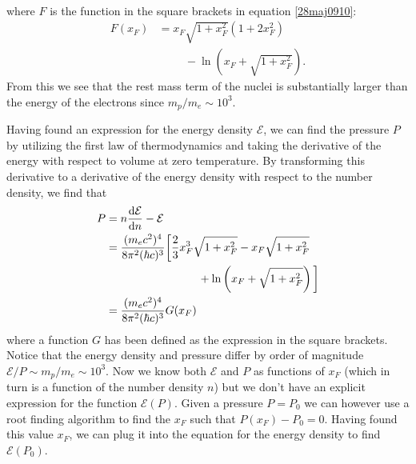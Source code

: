 \documentclass[twocolumn]{article}
\begin{document}
\begin{large}
\begin{equation}
\begin{split}
    \end{split}
\end{equation}
where $F$ is the function in the square brackets in equation \eqref{28maj0910}:
\begin{equation}
    \begin{split}
        F(x_F) &= x_F\sqrt{1+x_F^2}\left(1+2x_F^2\right) \\ 
        &\hspace{1cm}-\ln\left(x_F+\sqrt{1+x_F^2}\right).
    \end{split}
\end{equation}
From this we see that the rest mass term of the nuclei is substantially larger than the energy of the electrons since $m_p/m_e\sim 10^3$. 

Having found an expression for the energy density $\mathcal{E}$, we can find the pressure $P$ by utilizing the first law of thermodynamics and taking the derivative of the energy with respect to volume at zero temperature. By transforming this derivative to a derivative of the energy density with respect to the number density, we find that
\begin{equation}
    \label{28maj1025}
    \begin{split}
        P &= n\frac{\text{d}\mathcal{E}}{\text{d}n} - \mathcal{E} \\ 
        &= \frac{(m_ec^2)^4}{8\pi^2(\hbar c)^3}\bigg[\frac{2}{3}x_F^3\sqrt{1+x_F^2}-x_F\sqrt{1+x_F^2} \\ 
        &\hspace{2.90cm}+\ln\left(x_F+\sqrt{1+x_F^2}\right)\bigg] \\ 
        &= \frac{(m_ec^2)^4}{8\pi^2(\hbar c)^3}G(x_F)
    \end{split}
\end{equation}
where a function $G$ has been defined as the expression in the square brackets. Notice that the energy density and pressure differ by order of magnitude $\mathcal{E}/P\sim m_p/m_e\sim 10^3$. Now we know both $\mathcal{E}$ and $P$ as functions of $x_F$ (which in turn is a function of the number density $n$) but we don't have an explicit expression for the function $\mathcal{E}(P)$. Given a pressure $P=P_0$ we can however use a root finding algorithm to find the $x_F$ such that $P(x_F) - P_0 = 0$. Having found this value $x_F$, we can plug it into the equation for the energy density to find $\mathcal{E}(P_0)$. 


\end{large}
\end{document}
